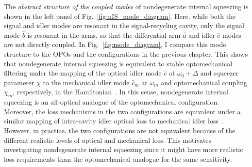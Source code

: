 The \emph{abstract structure of the coupled modes} of nondegenerate internal squeezing is shown in the left panel of Fig.~\ref{fig:nIS_mode_diagram}. Here, while both the signal and idler modes are resonant in the signal-recycling cavity, only the signal mode $\hat b$ is resonant in the arms, so that the differential arm $\hat a$ and idler $\hat c$ modes are not directly coupled. In Fig.~\ref{fig:mode_diagram}, I compare this mode structure to the OPOs and the configurations in the previous chapter. This shows that nondegenerate internal squeezing is equivalent to stable optomechanical filtering under the mapping of the optical idler mode $\hat c$ at $\omega_0+\Delta$ and squeezer parameter $\chi$ to the mechanical idler mode $\hat{c}_m$ at $\omega_m$ and optomechanical coupling $\chi_m$, respectively, in the Hamiltonian~\cite{liBroadbandSensitivityImprovement2020}. In this sense, nondegenerate internal squeezing is an all-optical analogue of the optomechanical configuration.
Moreover, the loss mechanisms in the two configurations are equivalent under a similar mapping of intra-cavity idler optical loss to mechanical idler loss~\cite{}. However, in practice, the two configurations are not equivalent because of the different realistic levels of optical and mechanical loss. This motivates investigating nondegenerate internal squeezing since it might have more realistic loss requirements than the optomechanical analogue for the same sensitivity. %



